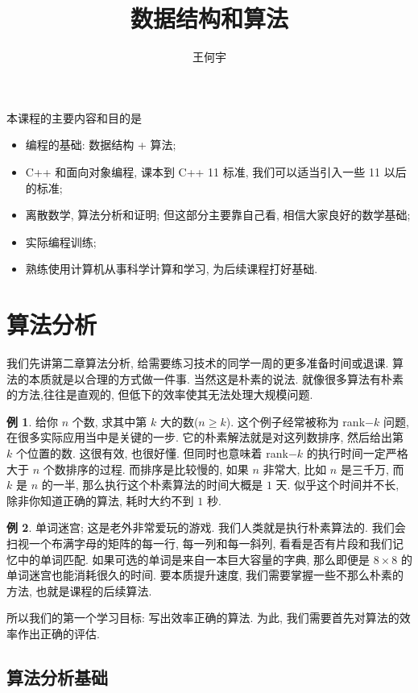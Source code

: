 \documentclass[a4paper]{ctexart}
\title{数据结构和算法}
\author{王何宇}
\date{}
\theoremstyle{definition}
\theoremstyle{definition}
\newtheorem{example}{例}[section]
\begin{document}
\maketitle
\pagestyle{empty}

本课程的主要内容和目的是
\begin{itemize}
\item 编程的基础: 数据结构 + 算法;
\item C++ 和面向对象编程, 课本到 C++ 11 标准, 我们可以适当引入一些 11 以后的标准;
\item 离散数学, 算法分析和证明; 但这部分主要靠自己看, 相信大家良好的数学基础; 
\item 实际编程训练;
\item 熟练使用计算机从事科学计算和学习, 为后续课程打好基础.
\end{itemize}

\section{算法分析}
我们先讲第二章算法分析, 给需要练习技术的同学一周的更多准备时间或退课.
算法的本质就是以合理的方式做一件事. 当然这是朴素的说法.
就像很多算法有朴素的方法,往往是直观的,
但低下的效率使其无法处理大规模问题.

\begin{example}
  给你 $n$ 个数, 求其中第 $k$ 大的数($n \geq k$).
这个例子经常被称为 rank$-k$ 问题,在很多实际应用当中是关键的一步.
它的朴素解法就是对这列数排序, 然后给出第 $k$ 个位置的数. 这很有效,
也很好懂. 但同时也意味着 rank$-k$ 的执行时间一定严格大于 $n$ 个数排序的过程.
而排序是比较慢的, 如果 $n$ 非常大, 比如 $n$ 是三千万, 而 $k$ 是 $n$ 的一半,
那么执行这个朴素算法的时间大概是 $1$ 天. 似乎这个时间并不长, 除非你知道正确的算法,
耗时大约不到 $1$ 秒.
\end{example}

\begin{example}
  单词迷宫; 这是老外非常爱玩的游戏. 我们人类就是执行朴素算法的.
我们会扫视一个布满字母的矩阵的每一行, 每一列和每一斜列, 看看是否有片段和我们记忆中的单词匹配.
如果可选的单词是来自一本巨大容量的字典, 那么即便是 $8 \times 8$ 的单词迷宫也能消耗很久的时间.
要本质提升速度, 我们需要掌握一些不那么朴素的方法, 也就是课程的后续算法.
\end{example}

所以我们的第一个学习目标: 写出效率正确的算法. 为此, 我们需要首先对算法的效率作出正确的评估. 

\subsection{算法分析基础}
\end{document}
